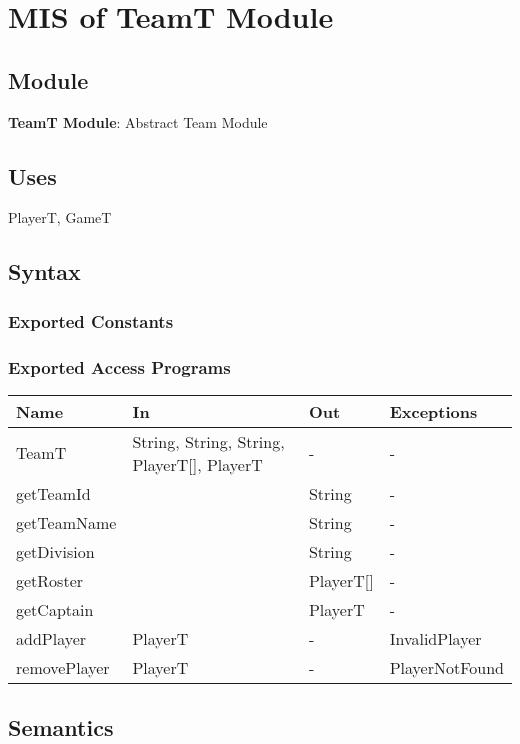 \documentclass[12pt, titlepage]{article}
\begin{document}
\section{MIS of TeamT Module} \label{TeamModule}

\subsection{Module}
\textbf{TeamT Module}: Abstract Team Module

\subsection{Uses}
PlayerT, GameT

\subsection{Syntax}

\subsubsection{Exported Constants}

\subsubsection{Exported Access Programs}

\begin{center}
  \begin{tabular}{|p{4cm}| p{4cm}| p{4cm} | p{3cm}|}
  \hline
  \textbf{Name} & \textbf{In} & \textbf{Out} & \textbf{Exceptions} \\
  \hline
  TeamT & String, String, String, PlayerT[], PlayerT & - & - \\
  getTeamId &  & String & - \\
  getTeamName &  & String & - \\
  getDivision &  & String & - \\
  getRoster &  & PlayerT[] & - \\
  getCaptain &  & PlayerT & - \\
  addPlayer & PlayerT & - & InvalidPlayer \\
  removePlayer & PlayerT & - & PlayerNotFound \\
  \hline
  \end{tabular}
\end{center}

\subsection{Semantics}
\end{document}
